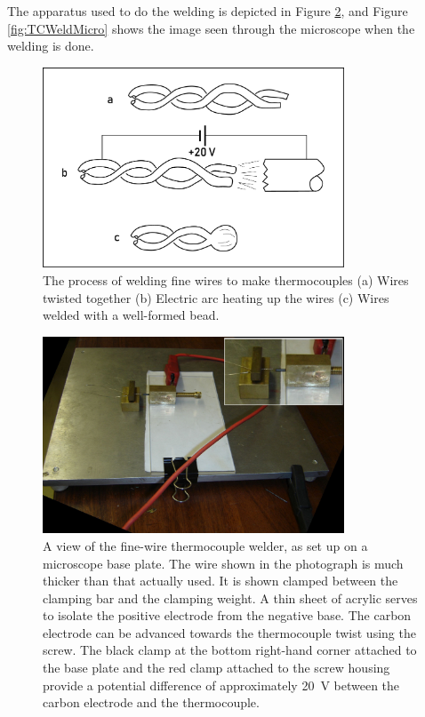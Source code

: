 The apparatus used to do the welding is depicted in Figure
\ref{fig:FineWireWelder}, and Figure \ref{fig:TCWeldMicro} shows the image seen
through the microscope when the welding is done.

\begin{figure}
	\centering
	\includegraphics[width=0.8\textwidth]{Figures/TCWelding}
	\decoRule

\caption[Welding process schematic]{The process of welding fine wires to make
thermocouples (a) Wires twisted together (b) Electric arc heating up the wires
(c) Wires welded with a well-formed bead. }

\label{fig:WeldingSteps}
\end{figure}


\begin{figure}
	\centering
	\includegraphics[width=0.8\textwidth]{Figures/Welder3.jpg}
	\decoRule

\caption[Fine-wire welder]{A view of the fine-wire thermocouple welder, as set
up on a microscope base plate. The wire shown in the photograph is much thicker
than that actually used. It is shown clamped between the clamping bar and the
clamping weight. A thin sheet of acrylic serves to isolate the positive
electrode from the negative base. The carbon electrode can be advanced towards
the thermocouple twist using the screw. The black clamp at the bottom right-hand
corner attached to the base plate and the red clamp attached to the screw
housing provide a potential difference of approximately \SI{20}{V} between the
carbon electrode and the thermocouple. }

\label{fig:FineWireWelder}
\end{figure}

